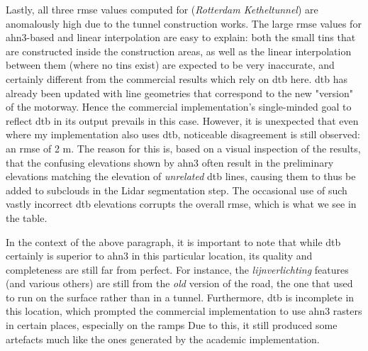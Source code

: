 Lastly, all three \ac{rmse} values computed for  (\textit{Rotterdam Ketheltunnel}) are anomalously high due to the tunnel construction works. The large \ac{rmse} values for \ac{ahn3}-based and linear interpolation are easy to explain: both the small \ac{tin}s that are constructed inside the construction areas, as well as the linear interpolation between them (where no \ac{tin}s exist) are expected to be very inaccurate, and certainly different from the commercial results which rely on \ac{dtb} here. \ac{dtb} has already been updated with line geometries that correspond to the new "version" of the motorway. Hence the commercial implementation's single-minded goal to reflect \ac{dtb} in its output prevails in this case. However, it is unexpected that even where my implementation also uses \ac{dtb}, noticeable disagreement is still observed: an \ac{rmse} of 2 m. The reason for this is, based on a visual inspection of the results, that the confusing elevations shown by \ac{ahn3} often result in the preliminary elevations matching the elevation of \textit{unrelated} \ac{dtb} lines, causing them to thus be added to subclouds in the Lidar segmentation step. The occasional use of such vastly incorrect \ac{dtb} elevations corrupts the overall \ac{rmse}, which is what we see in the table.

In the context of the above paragraph, it is important to note that while \ac{dtb} certainly is superior to \ac{ahn3} in this particular location, its quality and completeness are still far from perfect. For instance, the \textit{lijnverlichting} features (and various others) are still from the \textit{old} version of the road, the one that used to run on the surface rather than in a tunnel. Furthermore, \ac{dtb} is incomplete in this location, which prompted the commercial implementation to use \ac{ahn3} rasters in certain places, especially on the ramps Due to this, it still produced some artefacts much like the ones generated by the academic implementation.